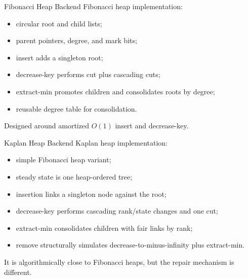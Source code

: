 \documentclass[10pt,aspectratio=43]{beamer}
\begin{document}
\begin{frame}{Fibonacci Heap Backend}
    Fibonacci heap implementation:

    \begin{itemize}
        \item circular root and child lists;
        \item parent pointers, degree, and mark bits;
        \item insert adds a singleton root;
        \item decrease-key performs cut plus cascading cuts;
        \item extract-min promotes children and consolidates roots by degree;
        \item reusable degree table for consolidation.
    \end{itemize}

    \vspace{0.5em}
    Designed around amortized $O(1)$ insert and decrease-key.
\end{frame}

\begin{frame}{Kaplan Heap Backend}
    Kaplan heap implementation:

    \begin{itemize}
        \item simple Fibonacci heap variant;
        \item steady state is one heap-ordered tree;
        \item insertion links a singleton node against the root;
        \item decrease-key performs cascading rank/state changes and one cut;
        \item extract-min consolidates children with fair links by rank;
        \item remove structurally simulates decrease-to-minus-infinity plus extract-min.
    \end{itemize}

    \vspace{0.5em}
    It is algorithmically close to Fibonacci heaps, but the repair mechanism is different.
\end{frame}
\end{document}
